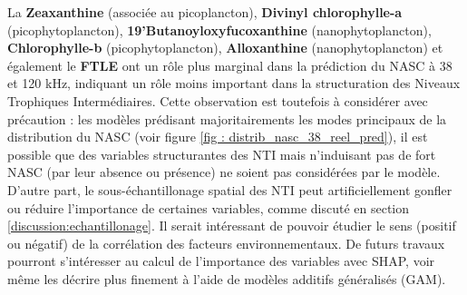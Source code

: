 \documentclass[11pt,a4paper,oneside]{report}
\begin{document}
	La \textbf{Zeaxanthine} (associée au picoplancton), \textbf{Divinyl chlorophylle-a} (picophytoplancton), \textbf{19'Butanoyloxyfucoxanthine} (nanophytoplancton), \textbf{Chlorophylle-b} (picophytoplancton), \textbf{Alloxanthine} (nanophytoplancton) et également le \textbf{FTLE} ont un rôle plus marginal dans la prédiction du NASC à 38 et 120 kHz, indiquant un rôle moins important dans la structuration des Niveaux Trophiques Intermédiaires. Cette observation est toutefois à considérer avec précaution : les modèles prédisant majoritairements les modes principaux de la distribution du NASC (voir figure \ref{fig : distrib_nasc_38_reel_pred}), il est possible que des variables structurantes des NTI mais n'induisant pas de fort NASC (par leur absence ou présence) ne soient pas considérées par le modèle. D'autre part, le sous-échantillonage spatial des NTI peut artificiellement gonfler ou réduire l'importance de certaines variables, comme discuté en section \ref{discussion:echantillonage}. Il serait intéressant de pouvoir étudier le sens (positif ou négatif) de la corrélation des facteurs environnementaux. De futurs travaux pourront s'intéresser au calcul de l'importance des variables avec SHAP, voir même les décrire plus finement à l'aide de modèles additifs généralisés (GAM).
	
\end{document}
